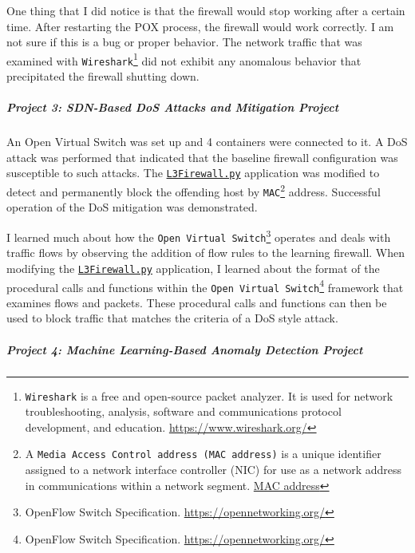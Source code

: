 One thing that I did notice is that the firewall would stop working after a certain time.  After restarting the POX process, the firewall would work correctly.  I am not sure if this is a bug or proper behavior.  The network traffic that was examined with \texttt{Wireshark}\footnote{\texttt{Wireshark} is a free and open-source packet analyzer. It is used for network troubleshooting, analysis, software and communications protocol development, and education. \href{https://www.wireshark.org/}{https://www.wireshark.org/}} did not exhibit any anomalous behavior that precipitated the firewall shutting down.

\subparagraph{Project 3: SDN-Based DoS Attacks and Mitigation Project}

An Open Virtual Switch was set up and 4 containers were connected to it.  A DoS attack was performed that indicated that the baseline firewall configuration was susceptible to such attacks.  The \href{/sections/mcs-projects/mcs-portfolio-project/l3firewall}{\texttt{L3Firewall.py}} application was modified to detect and permanently block the offending host by \texttt{MAC}\footnote{A \texttt{Media Access Control address (MAC address)} is a unique identifier assigned to a network interface controller (NIC) for use as a network address in communications within a network segment. \href{https://en.wikipedia.org/wiki/MAC\_address}{MAC address}} address.  Successful operation of the DoS mitigation was demonstrated.

I learned much about how the \texttt{Open Virtual Switch}\footnote{OpenFlow Switch Specification. \href{https://opennetworking.org/}{https://opennetworking.org/}} operates and deals with traffic flows by observing the addition of flow rules to the learning firewall.  When modifying the \href{/sections/mcs-projects/mcs-portfolio-project/l3firewall}{\texttt{L3Firewall.py}} application, I learned about the format of the procedural calls and functions within the \texttt{Open Virtual Switch}\footnote{OpenFlow Switch Specification. \href{https://opennetworking.org/}{https://opennetworking.org/}} framework that examines flows and packets.  These procedural calls and functions can then be used to block traffic that matches the criteria of a DoS style attack.

\subparagraph{Project 4: Machine Learning-Based Anomaly Detection Project}

